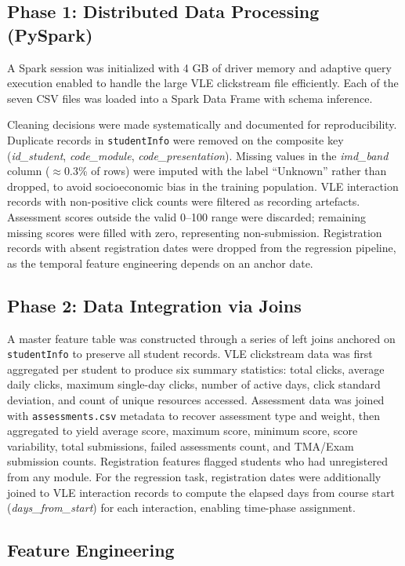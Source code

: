 \documentclass[conference]{IEEEtran}
\begin{document}
\subsection{Phase 1: Distributed Data Processing (PySpark)}
A Spark session was initialized with 4 GB of driver memory and adaptive query execution enabled to handle the large VLE clickstream file efficiently. Each of the seven CSV files was loaded into a Spark Data Frame with schema inference.

Cleaning decisions were made systematically and documented for reproducibility. Duplicate records in \texttt{studentInfo} were removed on the composite key (\textit{id\_student}, \textit{code\_module}, \textit{code\_presentation}). Missing values in the \textit{imd\_band} column ($\approx$0.3\% of rows) were imputed with the label ``Unknown'' rather than dropped, to avoid socioeconomic bias in the training population. VLE interaction records with non-positive click counts were filtered as recording artefacts. Assessment scores outside the valid 0--100 range were discarded; remaining missing scores were filled with zero, representing non-submission. Registration records with absent registration dates were dropped from the regression pipeline, as the temporal feature engineering depends on an anchor date.

\subsection{Phase 2: Data Integration via Joins}
A master feature table was constructed through a series of left joins anchored on \texttt{studentInfo} to preserve all student records. VLE clickstream data was first aggregated per student to produce six summary statistics: total clicks, average daily clicks, maximum single-day clicks, number of active days, click standard deviation, and count of unique resources accessed. Assessment data was joined with \texttt{assessments.csv} metadata to recover assessment type and weight, then aggregated to yield average score, maximum score, minimum score, score variability, total submissions, failed assessments count, and TMA/Exam submission counts. Registration features flagged students who had unregistered from any module. For the regression task, registration dates were additionally joined to VLE interaction records to compute the elapsed days from course start (\textit{days\_from\_start}) for each interaction, enabling time-phase assignment.

\subsection{Feature Engineering}
\end{document}
